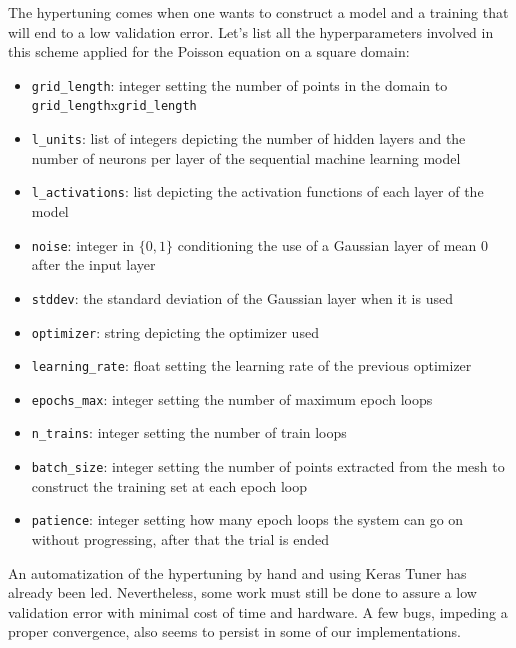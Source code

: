\documentclass{article}
\theoremstyle{definition}
\theoremstyle{property}
\theoremstyle{remark}
\begin{document}
	The hypertuning comes when one wants to construct a model and a training that will end to a low validation error. Let's list all the hyperparameters involved in this scheme applied for the Poisson equation on a square domain:
	\begin{itemize}
		\item \texttt{grid\_length}: integer setting the number of points in the domain to \texttt{grid\_length}x\texttt{grid\_length}
		\item \texttt{l\_units}: list of integers depicting the number of hidden layers and the number of neurons per layer of the sequential machine learning model
		\item \texttt{l\_activations}: list depicting the activation functions of each layer of the model
		\item \texttt{noise}: integer in $\{0,1\}$ conditioning the use of a Gaussian layer of mean $0$ after the input layer
		\item \texttt{stddev}: the standard deviation of the Gaussian layer when it is used
		\item \texttt{optimizer}: string depicting the optimizer used
		\item \texttt{learning\_rate}: float setting the learning rate of the previous optimizer
		\item \texttt{epochs\_max}: integer setting the number of maximum epoch loops
		\item \texttt{n\_trains}: integer setting the number of train loops
		\item \texttt{batch\_size}: integer setting the number of points extracted from the mesh to construct the training set at each epoch loop
		\item \texttt{patience}: integer setting how many epoch loops the system can go on without progressing, after that the trial is ended
	\end{itemize}
	
	An automatization of the hypertuning by hand and using Keras Tuner has already been led. Nevertheless, some work must still be done to assure a low validation error with minimal cost of time and hardware. A few bugs, impeding a proper convergence, also seems to persist in some of our implementations.
	
	
	
\end{document}
